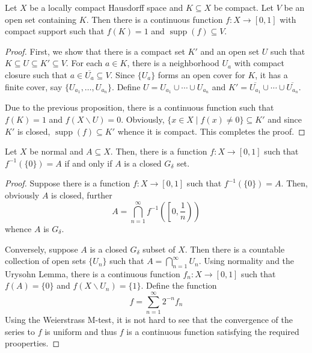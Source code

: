 \begin{theorem}
    Let $X$ be a locally compact Hausdorff space and $K\subseteq X$ be compact. Let $V$ be an open set containing $K$. Then there is a continuous function $f: X\to[0,1]$ with compact support such that $f(K) = 1$ and $\operatorname{supp}(f)\subseteq V$.
\end{theorem}
\begin{proof}
    First, we show that there is a compact set $K'$ and an open set $U$ such that $K\subseteq U\subseteq K'\subseteq V$. For each $a\in K$, there is a neighborhood $U_a$ with compact closure such that $a\in\overline{U_a}\subseteq V$. Since $\{U_a\}$ forms an open cover for $K$, it has a finite cover, say $\{U_{a_1},\ldots,U_{a_n}\}$. Define $U = U_{a_1}\cup\cdots\cup U_{a_n}$ and $K' = \overline{U_{a_1}}\cup\cdots\cup\overline{U_{a_n}}$. 

    Due to the previous proposition, there is a continuous function such that $f(K) = 1$ and $f(X\backslash U) = 0$. Obviously, $\{x\in X\mid f(x)\ne 0\}\subseteq K'$ and since $K'$ is closed, $\operatorname{supp}(f)\subseteq K'$ whence it is compact. This completes the proof.
\end{proof}

\begin{lemma}
    Let $X$ be normal and $A\subseteq X$. Then, there is a function $f: X\to[0,1]$ such that $f^{-1}(\{0\}) = A$ if and only if $A$ is a closed $G_\delta$ set.
\end{lemma}
\begin{proof}
    Suppose there is a function $f: X\to[0,1]$ such that $f^{-1}(\{0\}) = A$. Then, obviously $A$ is closed, further 
    \begin{equation*}
        A = \bigcap_{n = 1}^\infty f^{-1}\left(\left[0,\frac{1}{n}\right)\right)
    \end{equation*}
    whence $A$ is $G_\delta$.

    Conversely, suppose $A$ is a closed $G_\delta$ subset of $X$. Then there is a countable collection of open sets $\{U_n\}$ such that $A = \bigcap_{n = 1}^\infty U_n$. Using normality and the Urysohn Lemma, there is a continuous function $f_n: X\to[0,1]$ such that $f(A) = \{0\}$ and $f(X\backslash U_n) = \{1\}$. Define the function 
    \begin{equation*}
        f = \sum_{n = 1}^\infty 2^{-n}f_n
    \end{equation*}
    Using the Weierstrass M-test, it is not hard to see that the convergence of the series to $f$ is uniform and thus $f$ is a continuous function satisfying the required prooperties.
\end{proof}

